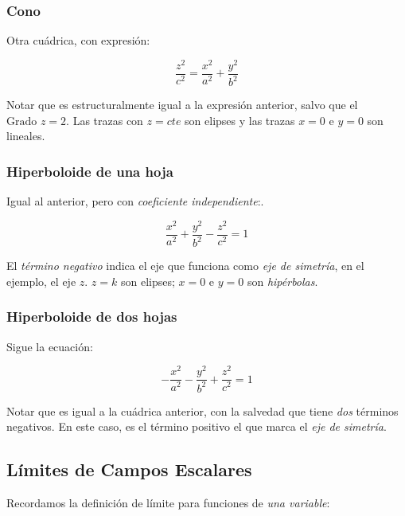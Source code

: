 \subsubsection{Cono}

Otra cuádrica, con expresión:

\begin{equation*}
    \frac{z^{2}}{c^{2}} = \frac{x^{2}}{a^{2}} + \frac{y^{2}}{b^{2}}
\end{equation*}

Notar que es estructuralmente igual a la expresión anterior, salvo que el 
\(\text{Grado }z = 2\).
Las trazas con \(z = cte\) son elipses y las trazas \(x = 0\) e \(y = 0\) son 
lineales.

\subsubsection{Hiperboloide de una hoja}

Igual al anterior, pero con \textit{coeficiente independiente}:.

\begin{equation*}
    \frac{x^{2}}{a^{2}} + \frac{y^{2}}{b^{2}} - \frac{z^{2}}{c^{2}} = \boxed{1}
\end{equation*}

El \textit{término negativo} indica el eje que funciona como \textit{eje de 
simetría}, en el ejemplo, el eje \(z\). \(z = k\) son elipses; \(x=0\) e \(y=0\)
son \textit{hipérbolas}.

\subsubsection{Hiperboloide de dos hojas}

Sigue la ecuación:

\begin{equation*}
    -\frac{x^{2}}{a^{2}} - \frac{y^{2}}{b^{2}} + \frac{z^{2}}{c^{2}} = \boxed{1}
\end{equation*}

Notar que es igual a la cuádrica anterior, con la salvedad que tiene 
\textit{dos} términos negativos. En este caso, es el término positivo el que 
marca el \textit{eje de simetría}.

\subsection{Límites de Campos Escalares}

Recordamos la definición de límite para funciones de \textit{una variable}:


